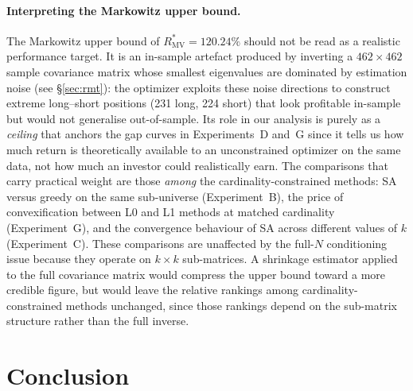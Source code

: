 \documentclass[11pt]{article}
\begin{document}
\paragraph{Interpreting the Markowitz upper bound.}
The Markowitz upper bound of $R^*_{\text{MV}}=120.24\%$ should not be
read as a realistic performance target.
It is an in-sample artefact produced by inverting a $462\times462$
sample covariance matrix whose smallest eigenvalues are dominated by
estimation noise (see \S\ref{sec:rmt}): the optimizer exploits these
noise directions to construct extreme long--short positions
(231 long, 224 short) that look profitable in-sample but would not
generalise out-of-sample.
Its role in our analysis is purely as a \emph{ceiling} that anchors the
gap curves in Experiments~D and~G since it tells us how much return is
theoretically available to an unconstrained optimizer on the same data,
not how much an investor could realistically earn.
The comparisons that carry practical weight are those \emph{among} the
cardinality-constrained methods: SA versus greedy on the same
sub-universe (Experiment~B), the price of convexification between L0
and L1 methods at matched cardinality (Experiment~G), and the
convergence behaviour of SA across different values of $k$ (Experiment~C).
These comparisons are unaffected by the full-$N$ conditioning issue
because they operate on $k\times k$ sub-matrices.
A shrinkage estimator applied
to the full covariance matrix would compress the upper bound toward a
more credible figure, but would leave the relative rankings among
cardinality-constrained methods unchanged, since those rankings depend
on the sub-matrix structure rather than the full inverse.

\section{Conclusion}
\label{sec:conclusion}
\end{document}
